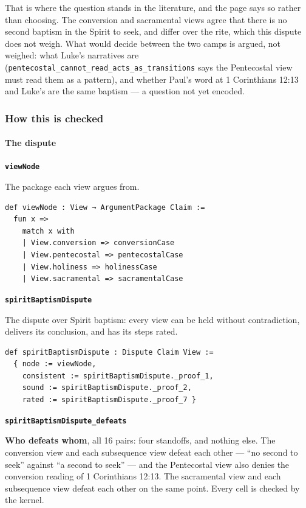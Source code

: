 \documentclass[11pt]{article}
\begin{document}
That is where the question stands in the literature, and the page says so rather than choosing. The conversion and sacramental views agree that there is no second baptism in the Spirit to seek, and differ over the rite, which this dispute does not weigh. What would decide between the two camps is argued, not weighed: what Luke’s narratives are (\texttt{pentecostal\_\allowbreak{}cannot\_\allowbreak{}read\_\allowbreak{}acts\_\allowbreak{}as\_\allowbreak{}transitions} says the Pentecostal view must read them as a pattern), and whether Paul’s word at 1 Corinthians 12:13 and Luke’s are the same baptism — a question not yet encoded.

\subsubsection*{How this is checked}
\paragraph*{The dispute}
\leavevmode\par\nobreak
\par\medskip\noindent\textbf{\texttt{view\allowbreak{}Node}}\par\nobreak\noindent
The package each view argues from.

{\small\begin{verbatim}
def viewNode : View → ArgumentPackage Claim :=
  fun x =>
    match x with
    | View.conversion => conversionCase
    | View.pentecostal => pentecostalCase
    | View.holiness => holinessCase
    | View.sacramental => sacramentalCase
\end{verbatim}}
\par\medskip\noindent\textbf{\texttt{spirit\allowbreak{}Baptism\allowbreak{}Dispute}}\par\nobreak\noindent
The dispute over Spirit baptism: every view can be held without contradiction, delivers its conclusion, and has its steps rated.

{\small\begin{verbatim}
def spiritBaptismDispute : Dispute Claim View :=
  { node := viewNode,
    consistent := spiritBaptismDispute._proof_1,
    sound := spiritBaptismDispute._proof_2,
    rated := spiritBaptismDispute._proof_7 }
\end{verbatim}}
\par\medskip\noindent\textbf{\texttt{spirit\allowbreak{}Baptism\allowbreak{}Dispute\_\allowbreak{}defeats}}\par\nobreak\noindent
\textbf{Who defeats whom}, all 16 pairs: four standoffs, and nothing else. The conversion view and each subsequence view defeat each other — “no second to seek” against “a second to seek” — and the Pentecostal view also denies the conversion reading of 1 Corinthians 12:13. The sacramental view and each subsequence view defeat each other on the same point. Every cell is checked by the kernel.
\end{document}
